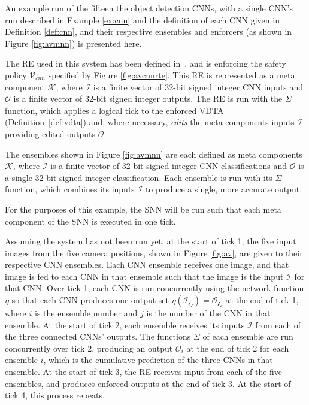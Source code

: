 \begin{example}
	\label{ex:runsnn}
	An example run of the fifteen the object detection \acp{CNN}, with a single \ac{CNN}'s run described in Example \ref{ex:cnn} and the definition of each \ac{CNN} given in Definition \ref{def:cnn}, and their respective ensembles and enforcers (as shown in Figure \ref{fig:avmnn}) is presented here.
	
	The \ac{RE} used in this system has been defined in~\cite{recps}, and is enforcing the safety policy $\mathcal{V}_{cnn}$ specified by Figure \ref{fig:avcnnrte}.
	This \ac{RE} is represented as a meta component $\mathcal{K}$, where $\mathcal{I}$ is a finite vector of 32-bit signed integer \ac{CNN} inputs and $\mathcal{O}$ is a finite vector of 32-bit signed integer outputs.
	The \ac{RE} is run with the $\Sigma$ function, which applies a logical tick to the enforced \ac{VDTA} (Definition~\ref{def:vdta}) and, where necessary, \textit{edits} the meta components inputs $\mathcal{I}$ providing edited outputs $\mathcal{O}$.
	
	The ensembles shown in Figure \ref{fig:avmnn} are each defined as meta components $\mathcal{K}$, where $\mathcal{I}$ is a finite vector of 32-bit signed integer \ac{CNN} classifications and $\mathcal{O}$ is a single 32-bit signed integer classification.
	Each ensemble is run with its $\Sigma$ function, which combines its inputs $\mathcal{I}$ to produce a single, more accurate output.
	
	For the purposes of this example, the \ac{SNN} will be run such that each meta component of the \ac{SNN} is executed in one tick.
	
	Assuming the system has not been run yet, at the start of tick 1, the five input images from the five camera positions, shown in Figure \ref{fig:av}, are given to their respective \ac{CNN} ensembles.
	Each \ac{CNN} ensemble receives one image, and that image is fed to each \ac{CNN} in that ensemble such that the image is the input $\mathcal{I}$ for that \ac{CNN}.
	Over tick 1, each \ac{CNN} is run concurrently using the network function $\eta$ so that each \ac{CNN} produces one output set $\eta(\mathcal{I_{i_j}}) = \mathcal{O_{i_j}}$ at the end of tick 1, where $i$ is the ensemble number and $j$ is the number of the \ac{CNN} in that ensemble.
	At the start of tick 2, each ensemble receives its inputs $\mathcal{I}$ from each of the three connected \acp{CNN}' outputs.
	The functions $\Sigma$ of each ensemble are run concurrently over tick 2, producing an output $\mathcal{O}_i$ at the end of tick 2 for each ensemble $i$, which is the cumulative prediction of the three \acp{CNN} in that ensemble.
	At the start of tick 3, the \ac{RE} receives input from each of the five ensembles, and produces enforced outputs at the end of tick 3.
	At the start of tick 4, this process repeats.
\end{example}

